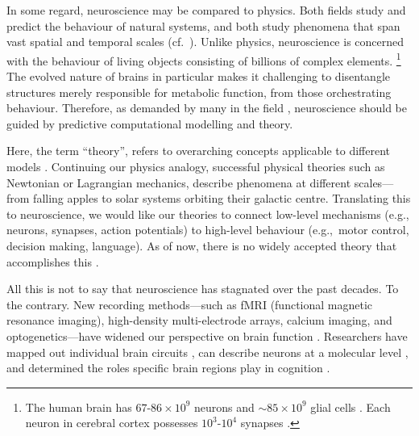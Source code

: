 In some regard, neuroscience may be compared to physics.
Both fields study and predict the behaviour of natural systems, and both study phenomena that span vast spatial and temporal scales
(cf.~).
Unlike physics, neuroscience is concerned with the behaviour of living objects consisting of billions of complex elements.%
\footnote{The human brain has $67$-$86\times10^{9}$ neurons and $\sim$$85\times10^9$ glial cells \citep{vonbartheld2016search}. Each neuron in cerebral cortex possesses $10^3$-$10^4$ synapses \citep[Chapter~6]{braitenberg2013anatomy}.}
The evolved nature of brains in particular makes it challenging to disentangle structures merely responsible for metabolic function, from those orchestrating behaviour.
Therefore, as demanded by many in the field \citep[e.g.,][]{marr1982vision,churchland1992computational,eliasmith2003neural}, neuroscience should be guided by predictive computational modelling and theory.%

Here, the term \enquote{theory}, refers to overarching concepts applicable to different models \citep[e.g.,][]{stevens2000models}.
Continuing our physics analogy, successful physical theories such as Newtonian or Lagrangian mechanics, describe phenomena at different scales---from falling apples to solar systems orbiting their galactic centre.
Translating this to neuroscience, we would like our theories to connect low-level mechanisms (e.g., neurons, synapses, action potentials) to high-level behaviour (e.g.,~motor control, decision making, language).
As of now, there is no widely accepted theory that accomplishes this \citep[Chapter~9]{eliasmith2013how}.

All this is not to say that neuroscience has stagnated over the past decades.
To the contrary.
New recording methods---such as fMRI (functional magnetic resonance imaging), high-density multi-electrode arrays, calcium imaging, and optogenetics---have widened our perspective on brain function \citep{sejnowski2014putting}. Researchers have mapped out individual brain circuits \citep[e.g.,][]{shepherd2012handbook}, can describe neurons at a molecular level \citep[e.g.,][]{sobolevsky2009xray}, and determined the roles specific brain regions play in cognition \citep[e.g.,][]{kanwisher2006fusiform}.

